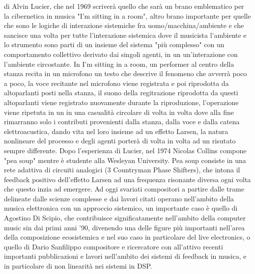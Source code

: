 di Alvin Lucier, che nel 1969 scriverà quello che sarà un brano emblematico per
la cibernetica in musica "I'm sitting in a room", altro brano importante per quelle che sono
le logiche di interazione sistemiche fra uomo/macchina/ambiente e che sancisce una volta per tutte
l'interazione sistemica dove il musicista l'ambiente e lo strumento sono parti di un insieme del
sistema "più complesso" con un comportamento collettivo derivato dai singoli agenti,
in un un'interazione con l'ambiente circostante.
In I'm sitting in a room, un performer al centro della stanza
recita in un microfono un testo che descrive il fenomeno che avverrà poco a poco,
la voce recitante nel microfono viene registrata e poi riprodotta da altoparlanti
posti nella stanza, il suono della regitrazione riprodotta da questi altoparlanti
viene registrato nuovamente durante la riproduzione, l'operazione
viene ripetuta in un in una casualità circolare di volta in volta dove alla fine rimarranno
solo i contributi provenienti dalla stanza, dalla voce e dalla catena elettroacustica,
dando vita nel loro insieme ad un effetto Larsen, la natura
nonlineare del processo e degli agenti porterà di volta in volta ad un risutato
sempre differente.
Dopo l'esperienza di Lucier, nel 1974 Nicolas Collins compone "pea soup"
mentre è studente alla Wesleyan University.
Pea soup consiste in una rete adattiva di circuiti analogici (3 Countryman Phase Shifters),
che intona il feedback positivo dell'effetto Larsen ad una frequenza risonante diversa
ogni volta che questo inzia ad emergere.
Ad oggi svariati compositori a partire dalle trame delineate dalle scienze complesse e
dai lavori citati operano nell'ambito della musica elettronica con un approccio sistemico,
un importante caso è quello di Agostino Di Scipio, che contribuisce significatamente
nell'ambito della computer music sin dai primi anni '90, divenendo una
delle figure più importanti nell'area della composizione ecosistemica e nel suo
caso in particolare del live electronics, o quello di Dario Sanfilippo
compositore e ricercatore con all'attivo recenti importanti pubblicazioni e lavori
nell'ambito dei sistemi di feedback in musica, e in particolare di non linearità nei sistemi
in DSP.
